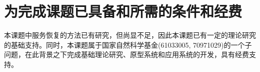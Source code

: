 \section{为完成课题已具备和所需的条件和经费}

本课题中服务恢复的方法已有研究，但尚显不足，因此本课题已有一定的理论研究的基础支持。同时，本课题属于国家自然科学基金(61033005, 70971029)的一个子问题，在此背景之下完成基础理论研究、原型系统和应用系统的开发，具有经费支持。